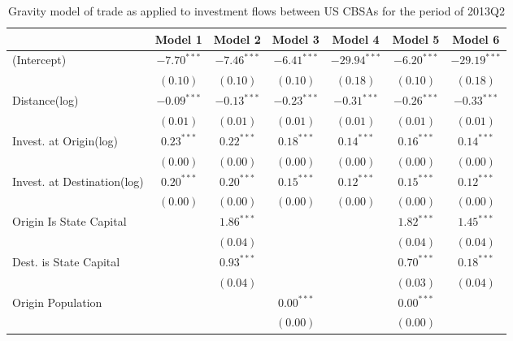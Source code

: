 \begin{table} 
	\begin{center}
	\small
		\caption[Gravity Model of Trade for Q2 2013]{Gravity model of trade as applied to investment flows between US CBSAs for the period of 2013Q2}
		\begin{tabular}{l c c c c c c }
			\hline
			& Model 1 & Model 2 & Model 3 & Model 4 & Model 5 & Model 6 \\
			\hline
			(Intercept)                  & $-7.70^{***}$ & $-7.46^{***}$ & $-6.41^{***}$ & $-29.94^{***}$ & $-6.20^{***}$ & $-29.19^{***}$ \\
			& $(0.10)$      & $(0.10)$      & $(0.10)$      & $(0.18)$       & $(0.10)$      & $(0.18)$       \\
			Distance(log)                   & $-0.09^{***}$ & $-0.13^{***}$ & $-0.23^{***}$ & $-0.31^{***}$  & $-0.26^{***}$ & $-0.33^{***}$  \\
			& $(0.01)$      & $(0.01)$      & $(0.01)$      & $(0.01)$       & $(0.01)$      & $(0.01)$       \\
			Invest. at Origin(log)                  & $0.23^{***}$  & $0.22^{***}$  & $0.18^{***}$  & $0.14^{***}$   & $0.16^{***}$  & $0.14^{***}$   \\
			& $(0.00)$      & $(0.00)$      & $(0.00)$      & $(0.00)$       & $(0.00)$      & $(0.00)$       \\
			Invest. at Destination(log)                 & $0.20^{***}$  & $0.20^{***}$  & $0.15^{***}$  & $0.12^{***}$   & $0.15^{***}$  & $0.12^{***}$   \\
			& $(0.00)$      & $(0.00)$      & $(0.00)$      & $(0.00)$       & $(0.00)$      & $(0.00)$       \\
			Origin Is State Capital          &               & $1.86^{***}$  &               &                & $1.82^{***}$  & $1.45^{***}$   \\
			&               & $(0.04)$      &               &                & $(0.04)$      & $(0.04)$       \\
			Dest. is State Capital     &               & $0.93^{***}$  &               &                & $0.70^{***}$  & $0.18^{***}$   \\
			&               & $(0.04)$      &               &                & $(0.03)$      & $(0.04)$       \\
			Origin Population           &               &               & $0.00^{***}$  &                & $0.00^{***}$  &                \\
			&               &               & $(0.00)$      &                & $(0.00)$      &                \\

\end{tabular}
\end{center}
\end{table}
